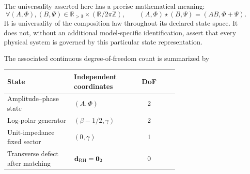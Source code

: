 \documentclass[11pt]{article}
\newcommand{\vzero}{\mathbf 0}
\begin{document}
The universality asserted here has a precise mathematical meaning:
\begin{equation}\label{eq:amplitude-phase-universality}
 \boxed{
 \forall(A,\Phi),(B,\Psi)\in
 \mathbb R_{>0}\times(\mathbb R/2\pi\mathbb Z),\qquad
 (A,\Phi)\star(B,\Psi)=(AB,\Phi+\Psi).}
\end{equation}
It is universality of the composition law throughout its declared state space.  It does not,
without an additional model-specific identification, assert that every physical system is
governed by this particular state representation.

The associated continuous degree-of-freedom count is summarized by
\begin{center}
\begin{tabular}{>{\raggedright\arraybackslash}p{0.39\linewidth}>{\raggedright\arraybackslash}p{0.31\linewidth}c}
\toprule
State & Independent coordinates & DoF\\
\midrule
Amplitude--phase state & $(A,\Phi)$ & $2$\\
Log-polar generator & $(\beta-1/2,\gamma)$ & $2$\\
Unit-impedance fixed sector & $(0,\gamma)$ & $1$\\
Transverse defect after matching & $\mathbf d_{\rm RH}=\vzero_2$ & $0$\\
\bottomrule
\end{tabular}
\end{center}
\end{document}
